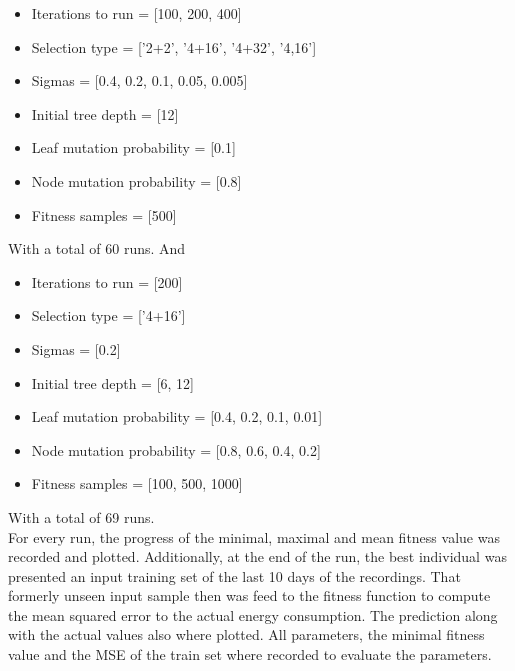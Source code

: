\documentclass[conference]{IEEEtran}
\begin{document}
\begin{itemize}
\item Iterations to run = [100, 200, 400]
\item Selection type = ['2+2',  '4+16', '4+32', '4,16']
\item Sigmas = [0.4, 0.2, 0.1, 0.05, 0.005]
\item Initial tree depth = [12]
\item Leaf mutation probability = [0.1]
\item Node mutation probability = [0.8]
\item Fitness samples = [500]
\end{itemize}
With a total of 60 runs. And

\begin{itemize}
\item Iterations to run = [200]
\item Selection type = ['4+16']
\item Sigmas = [0.2]
\item Initial tree depth = [6, 12]
\item Leaf mutation probability = [0.4, 0.2, 0.1, 0.01]
\item Node mutation probability = [0.8, 0.6, 0.4, 0.2]
\item Fitness samples = [100, 500, 1000]
\end{itemize}
With a total of 69 runs.\\
For every run, the progress of the minimal, maximal and mean fitness value was recorded and plotted. Additionally, at the end of the run, the best individual was presented an input training set of the last 10 days of the recordings. That formerly unseen input sample then was feed to the fitness function to compute the mean squared error to the actual energy consumption. The prediction along with the actual values also where plotted. All parameters, the minimal fitness value and the MSE of the train set where recorded to evaluate the parameters.

\end{document}
